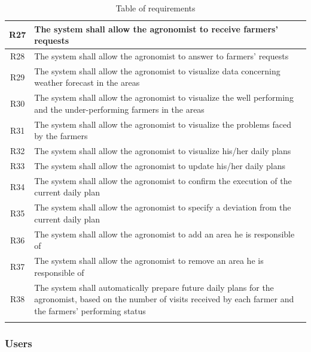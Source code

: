 \begin{center}
\begin{longtable}{|c|m{}|}
            \textsc{R27}  &    The system shall allow the agronomist to receive farmers' requests  \\
            \hline
            \textsc{R28}  &    The system shall allow the agronomist to answer to farmers' requests  \\
            \hline
            \textsc{R29}  &    The system shall allow the agronomist to visualize data concerning weather forecast in the areas  \\
            \hline
            \textsc{R30}  &    The system shall allow the agronomist to visualize the well performing and the under-performing farmers in the areas  \\
            \hline
            \textsc{R31}  &    The system shall allow the agronomist to visualize the problems faced by the farmers  \\
            \hline
            \textsc{R32}  &    The system shall allow the agronomist to visualize his/her daily plans  \\
            \hline
            \textsc{R33}  &    The system shall allow the agronomist to update his/her daily plans  \\
            \hline
            \textsc{R34}  &    The system shall allow the agronomist to confirm the execution of the current daily plan  \\
            \hline
            \textsc{R35}  &    The system shall allow the agronomist to specify a deviation from the current daily plan  \\
            \hline
            \textsc{R36}  &    The system shall allow the agronomist to add an area he is responsible of  \\
            \hline
            \textsc{R37}  &    The system shall allow the agronomist to remove an area he is responsible of  \\
            \hline
            \textsc{R38}  &    The system shall automatically prepare future daily plans for the agronomist, based on the number of visits received by each farmer and the farmers' performing status  \\
            \hline
        
        \rowcolor{white}\caption{\label{tab:requirements}Table of requirements}
        
    \end{longtable}
\end{center}


\subsubsection{Users}
\label{sect:users_requirements}


